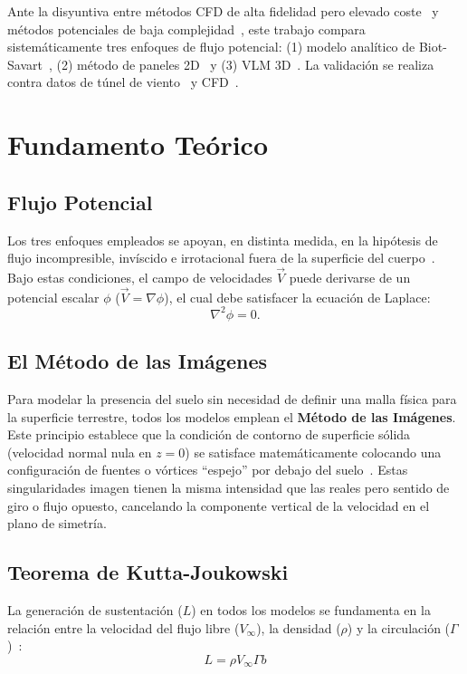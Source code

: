 \documentclass[twocolumn]{article}
\begin{document}
Ante la disyuntiva entre métodos CFD de alta fidelidad pero elevado coste~\cite{raymer2018} y métodos potenciales de baja complejidad~\cite{katz2001}, este trabajo compara sistemáticamente tres enfoques de flujo potencial: (1) modelo analítico de Biot-Savart~\cite{wieselsberger1922}, (2) método de paneles 2D~\cite{hess1967} y (3) VLM 3D~\cite{katz2001}. La validación se realiza contra datos de túnel de viento~\cite{hernandez2012} y CFD~\cite{autodesk2024}.

\section{Fundamento Teórico}

\subsection{Flujo Potencial}
Los tres enfoques empleados se apoyan, en distinta medida, en la hipótesis de flujo incompresible, invíscido e irrotacional fuera de la superficie del cuerpo~\cite{anderson2011}. Bajo estas condiciones, el campo de velocidades $\vec{V}$ puede derivarse de un potencial escalar $\phi$ ($\vec{V} = \nabla \phi$), el cual debe satisfacer la ecuación de Laplace:
\begin{equation}
\nabla^2 \phi = 0.
\label{eq:laplace}
\end{equation}

\subsection{El Método de las Imágenes}
Para modelar la presencia del suelo sin necesidad de definir una malla física para la superficie terrestre, todos los modelos emplean el \textbf{Método de las Imágenes}. Este principio establece que la condición de contorno de superficie sólida (velocidad normal nula en $z=0$) se satisface matemáticamente colocando una configuración de fuentes o vórtices ``espejo'' por debajo del suelo~\cite{katz2001}. Estas singularidades imagen tienen la misma intensidad que las reales pero sentido de giro o flujo opuesto, cancelando la componente vertical de la velocidad en el plano de simetría.

\subsection{Teorema de Kutta-Joukowski}
La generación de sustentación ($L$) en todos los modelos se fundamenta en la relación entre la velocidad del flujo libre ($V_{\infty}$), la densidad ($\rho$) y la circulación ($\Gamma$)~\cite{prandtl1921}:
\begin{equation}
L = \rho V_{\infty} \Gamma b
\label{eq:kj}
\end{equation}
\end{document}
